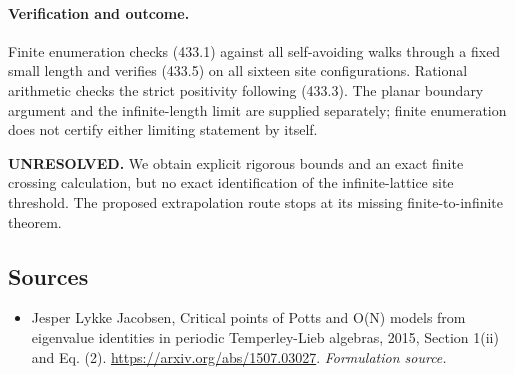 \documentclass[11pt]{article}
\begin{document}
\paragraph{Verification and outcome.}
Finite enumeration checks (433.1) against all self-avoiding walks through a fixed small length and verifies (433.5) on all sixteen site configurations. Rational arithmetic checks the strict positivity following (433.3). The planar boundary argument and the infinite-length limit are supplied separately; finite enumeration does not certify either limiting statement by itself.

\textbf{UNRESOLVED.} We obtain explicit rigorous bounds and an exact finite crossing calculation, but no exact identification of the infinite-lattice site threshold. The proposed extrapolation route stops at its missing finite-to-infinite theorem.

\subsection{Sources}
\begin{itemize}
\item[S1]Jesper Lykke Jacobsen, Critical points of Potts and O(N) models from eigenvalue identities in periodic Temperley-Lieb algebras, 2015, Section 1(ii) and Eq. (2).
\url{https://arxiv.org/abs/1507.03027}.
\textit{Formulation source.}
\end{itemize}
\end{document}
